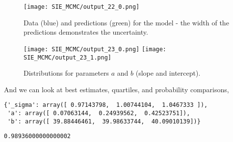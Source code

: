 \begin{Shaded}
\begin{Highlighting}[]
\NormalTok{)}
\NormalTok{)}
\end{Highlighting}
\end{Shaded}

\begin{figure}[htbp]
\centering
\texttt{[image: SIE\_MCMC/output\_22\_0.png]}
\caption{Data (blue) and predictions (green) for the model - the width of the predictions demonstrates the uncertainty.}
\end{figure}

\begin{Shaded}
\begin{Highlighting}[]
\end{Highlighting}
\end{Shaded}

\begin{figure}[htbp]
\centering
\texttt{[image: SIE\_MCMC/output\_23\_0.png]}
\texttt{[image: SIE\_MCMC/output\_23\_1.png]}
\caption{Distributions for parameters $a$ and $b$ (slope and intercept).}
\end{figure}

And we can look at best estimates, quartiles, and probability comparisons,

\begin{Shaded}
\begin{Highlighting}[]
\NormalTok{model.percentiles([}\NormalTok{,}\NormalTok{,}\NormalTok{])}
\end{Highlighting}
\end{Shaded}

\begin{verbatim}
{'_sigma': array([ 0.97143798,  1.00744104,  1.0467333 ]),
 'a': array([ 0.07063144,  0.24939562,  0.42523751]),
 'b': array([ 39.88446461,  39.98633744,  40.09010139])}
\end{verbatim}

\begin{Shaded}
\begin{Highlighting}[]
\NormalTok{)}
\end{Highlighting}
\end{Shaded}

\begin{verbatim}
0.98936000000000002
\end{verbatim}




